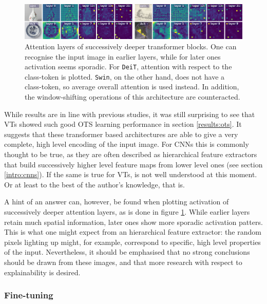 \begin{figure}[tb]
    \includegraphics[width=\textwidth]{img/layers.png}
    \caption{Attention layers of successively deeper transformer blocks. One can recognise the input image in earlier layers, while for later ones activation seems sporadic. For \texttt{DeiT}, attention with respect to the class-token is plotted. \texttt{Swin}, on the other hand, does not have a class-token, so average overall attention is used instead. In addition, the window-shifting operations of this architecture are counteracted.}
    \label{results:img:layers}
\end{figure}

While results are in line with previous studies, it was still surprising to see that VTs showed such good OTS learning performance in section \ref{results:ots}. It suggests that these transformer based architectures are able to give a very complete, high level encoding of the input image. For CNNs this is commonly thought to be true, as they are often described as hierarchical feature extractors that build successively higher level feature maps from lower level ones (see section \ref{intro:cnns}). If the same is true for VTs, is not well understood at this moment. Or at least to the best of the author's knowledge, that is.

A hint of an answer can, however, be found when plotting activation of successively deeper attention layers, as is done in figure \ref{results:img:layers}. While earlier layers retain much spatial information, later ones show more sporadic activation patters. This is what one might expect from an hierarchical feature extractor: the random pixels lighting up might, for example, correspond to specific, high level properties of the input. Nevertheless, it should be emphasised that no strong conclusions should be drawn from these images, and that more research with respect to explainability is desired.

\subsubsection{Fine-tuning} \label{exp:int:ft}

